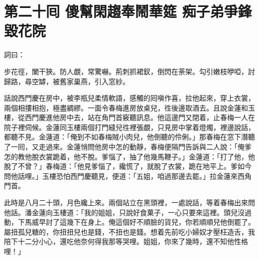 
\chapter*{第二十囘 傻幫閑趨奉鬧華筵 痴子弟爭鋒毀花院}


詞曰：

\begin{myquote} 
步花徑，闌干狹。防人覷，常驚嚇。荊刺抓裙釵，倒閃在荼架。勾引嫩枝咿啞，討歸路，尋空罅，被舊家巢燕，引入窓紗。

\end{myquote} 

話說西門慶在房中，被李瓶兒柔情軟語，{}感觸的囘嗔作喜，拉他起來，穿上衣裳，兩個相摟相抱，極盡綢繆。一面令春梅進房放桌兒，徃後邊取酒去。且說金蓮和玉樓，從西門慶進他房中去，站在角門首竅聽訊息。他這邊門又閉着，止春梅一人在院子裡伺候。金蓮同玉樓兩個打門縫兒徃裡張覷，只見房中掌着燈燭，裡邊說話，都聽不見。金蓮道：「俺到不如春梅賊小肉兒，他倒聽的伶俐。」那春梅在窓下潛聽了一囘，又走過來。金蓮悄問他房中怎的動靜，春梅便隔門告訴與二人說：「俺爹怎的教他脫衣裳跪着，他不脫。爹惱了，抽了他幾馬鞭子。」金蓮道：「打了他，他脫了不曾？」春梅道：「他見爹惱了，纔慌了，就脫了衣裳，跪在地平上。爹如今問他話哩。」玉樓恐怕西門慶聽見，便道：「五姐，咱過那邊去罷。」{}拉金蓮來西角門首。

此時是八月二十頭，月色纔上來。兩個站立在黑頭裡，一處說話，等着春梅出來問他話。潘金蓮向玉樓道：「我的姐姐，只說好食菓子，一心只要來這裡。頭兒沒過動，下馬威早討了這幾下在身上。俺這個好不順臉的貨兒，你若順順兒他倒罷了。屬扭孤兒糖的，你扭扭兒也是錢，不扭也是錢。想着先前吃小婦奴才壓枉造舌，我陪下十二分小心，還吃他奈何得我那等哭哩。姐姐，你來了幾時，還不知他性格哩！」


